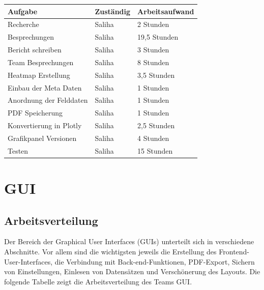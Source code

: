 \documentclass[12pt]{article}
\begin{document}
\begin{table}[h]
	\centering
	\begin{tabular}{l|l|l}
		Aufgabe                       & Zuständig & Arbeitsaufwand \\ 
		\hline
		Recherche                     & Saliha    & 2 Stunden       \\
		Besprechungen                 & Saliha    & 19,5 Stunden    \\
		Bericht schreiben             & Saliha    & 3 Stunden  		\\
		Team Besprechungen            & Saliha    & 8 Stunden 		\\
		Heatmap Erstellung            & Saliha    & 3,5 Stunden       \\
		Einbau der Meta Daten     	  & Saliha    & 1 Stunden       \\ 
		Anordnung der Felddaten       & Saliha    & 1 Stunden       \\
		PDF Speicherung               & Saliha    & 1 Stunden       \\
		Konvertierung in Plotly       & Saliha    & 2,5 Stunden       \\
		Grafikpanel Versionen         & Saliha    & 4 Stunden       \\ 
		Testen                        & Saliha    & 15 Stunden      \\ 
		
	\end{tabular}
\end{table}



\newpage
\pagestyle{fancy}
\fancyhead{}
\section{GUI}
\label{gui}

\subsection{Arbeitsverteilung}
\label{GUI-arbeitsverteilung}
Der Bereich der Graphical User Interfaces (GUIs) unterteilt sich in verschiedene Abschnitte. Vor allem sind die wichtigsten jeweils die Erstellung des Frontend-User-Interfaces, die Verbindung mit Back-end-Funktionen, PDF-Export, Sichern von Einstellungen, Einlesen von Datensätzen und Verschönerung des Layouts. Die folgende Tabelle zeigt die Arbeitsverteilung des Teams GUI.
\end{document}
